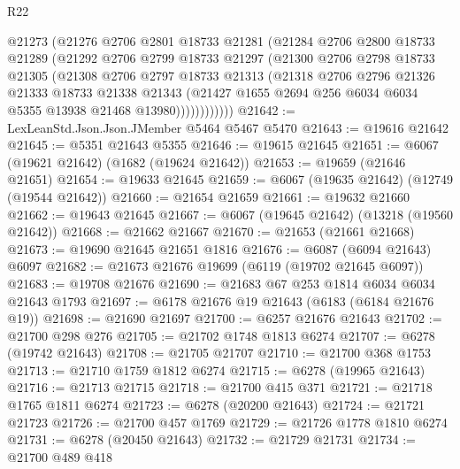 \begin{lexlean}{R22}
\begin{coremodule}
              @21273
              (@21276
                @2706
                @2801
                @18733
                @21281
                (@21284
                  @2706
                  @2800
                  @18733
                  @21289
                  (@21292
                    @2706
                    @2799
                    @18733
                    @21297
                    (@21300
                      @2706
                      @2798
                      @18733
                      @21305
                      (@21308
                        @2706
                        @2797
                        @18733
                        @21313
                        (@21318
                          @2706
                          @2796
                          @21326
                          @21333
                          @18733
                          @21338
                          @21343
                          (@21427
                            @1655
                            @2694
                            @256
                            @6034
                            @6034
                            @5355
                            @13938
                            @21468
                            @13980))))))))))))
@21642 := LexLeanStd.Json.Json.JMember @5464 @5467 @5470
@21643 := @19616 @21642
@21645 := @5351 @21643 @5355
@21646 := @19615 @21645
@21651 := @6067 (@19621 @21642) (@1682 (@19624 @21642))
@21653 := @19659 (@21646 @21651)
@21654 := @19633 @21645
@21659 := @6067 (@19635 @21642) (@12749 (@19544 @21642))
@21660 := @21654 @21659
@21661 := @19632 @21660
@21662 := @19643 @21645
@21667 := @6067 (@19645 @21642) (@13218 (@19560 @21642))
@21668 := @21662 @21667
@21670 := @21653 (@21661 @21668)
@21673 := @19690 @21645 @21651 @1816
@21676 := @6087 (@6094 @21643) @6097
@21682 := @21673 @21676 @19699 (@6119 (@19702 @21645 @6097))
@21683 := @19708 @21676
@21690 := @21683 @67 @253 @1814 @6034 @6034 @21643 @1793
@21697 := @6178 @21676 @19 @21643 (@6183 (@6184 @21676 @19))
@21698 := @21690 @21697
@21700 := @6257 @21676 @21643
@21702 := @21700 @298 @276
@21705 := @21702 @1748 @1813 @6274
@21707 := @6278 (@19742 @21643)
@21708 := @21705 @21707
@21710 := @21700 @368 @1753
@21713 := @21710 @1759 @1812 @6274
@21715 := @6278 (@19965 @21643)
@21716 := @21713 @21715
@21718 := @21700 @415 @371
@21721 := @21718 @1765 @1811 @6274
@21723 := @6278 (@20200 @21643)
@21724 := @21721 @21723
@21726 := @21700 @457 @1769
@21729 := @21726 @1778 @1810 @6274
@21731 := @6278 (@20450 @21643)
@21732 := @21729 @21731
@21734 := @21700 @489 @418

\end{coremodule}
\end{lexlean}
